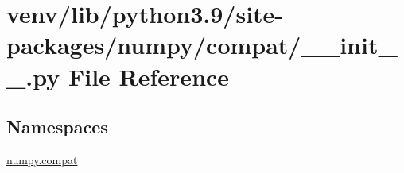 \hypertarget{venv_2lib_2python3_89_2site-packages_2numpy_2compat_2____init_____8py}{}\section{venv/lib/python3.9/site-\/packages/numpy/compat/\+\_\+\+\_\+init\+\_\+\+\_\+.py File Reference}
\label{venv_2lib_2python3_89_2site-packages_2numpy_2compat_2____init_____8py}
\subsection*{Namespaces}
\begin{DoxyCompactItemize}
\item 
 \hyperlink{namespacenumpy_1_1compat}{numpy.\+compat}
\end{DoxyCompactItemize}
